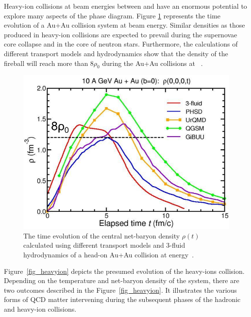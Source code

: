 Heavy-ion collisions at beam energies between  and  have an enormous potential to explore many aspects of the phase diagram. Figure \ref{fig:cbm_density} represents the time evolution of a Au+Au collision system at  beam energy. Similar densities as those produced in heavy-ion collisions are expected to prevail during the supernovae core collapse and in the core of neutron stars. Furthermore, the calculations of different transport models and hydrodynamics show that the density of the fireball will reach more than $8\rho_{0}$ during the Au+Au collisions at ~\cite{CBM_physics}.

\begin{figure}[!h]
    \centering
    \includegraphics[width=0.65\columnwidth]{Chapter1/images/CBM_density.png}
    \caption{The time evolution of the central net-baryon density $\rho(t)$ calculated using different transport models and 3-fluid hydrodynamics of a head-on Au+Au collision at  energy~\cite{CBM_physics}.}
    \label{fig:cbm_density}
\end{figure}

Figure~\ref{fig_heavyion} depicts the presumed evolution of the heavy-ions collision. Depending on the temperature and net-baryon density of the system, there are two outcomes described in the Figure~\ref{fig_heavyion}. It illustrates the various forms of QCD matter intervening during the subsequent phases of the hadronic and heavy-ion collisions.

